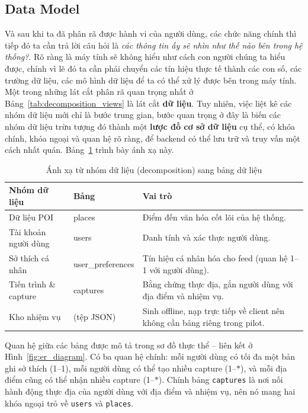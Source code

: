 \subsection{Data Model}
\contrib
Và sau khi ta đã phân rã được hành vi của người dùng, các chức năng chính thì tiếp đó ta cần trả lời câu hỏi là \textit{các thông tin
ấy sẽ nhìn như thế nào bên trong hệ thống?}. Rõ ràng là máy tính sẽ không hiểu như cách con người chúng ta hiểu được, chính vì lẽ đó 
ta cần phải chuyển các tín hiệu thực tế thành các con số, các trường dữ liệu, các mô hình dữ liệu để ta có thể xử lý được bên trong máy tính.
Một trong những lát cắt phân rã quan trọng nhất ở Bảng~\ref{tab:decomposition_views}
là lát cắt \textbf{dữ liệu}. Tuy nhiên, việc liệt kê các nhóm dữ liệu mới
chỉ là bước trung gian, bước quan trọng ở đây là biến các
nhóm dữ liệu trừu tượng đó thành một \textbf{lược đồ cơ sở dữ liệu} cụ
thể, có khóa chính, khóa ngoại và quan hệ rõ ràng, để backend có thể lưu
trữ và truy vấn một cách nhất quán. Bảng~\ref{tab:decomp_to_db} trình bày
ánh xạ này.

\begin{table}[H]
\centering
\caption{Ánh xạ từ nhóm dữ liệu (decomposition) sang bảng dữ liệu}
\label{tab:decomp_to_db}
\begin{tabularx}{\textwidth}{>{\raggedright\arraybackslash}p{3.6cm} >{\ttfamily\raggedright\arraybackslash}p{3.0cm} X}
\toprule
\textbf{Nhóm dữ liệu} & \textbf{\normalfont Bảng} & \textbf{Vai trò} \\
\midrule
Dữ liệu POI & places & Điểm đến văn hóa cốt lõi của hệ thống. \\
Tài khoản người dùng & users & Danh tính và xác thực người dùng. \\
Sở thích cá nhân & user\_preferences & Tín hiệu cá nhân hóa cho feed (quan hệ 1--1 với người dùng). \\
Tiến trình \& capture & captures & Bằng chứng thực địa, gắn người dùng với địa điểm và nhiệm vụ. \\
Kho nhiệm vụ & \textnormal{(tệp JSON)} & Sinh offline, nạp trực tiếp về client nên không cần bảng riêng trong pilot. \\
\bottomrule
\end{tabularx}
\end{table}

Quan hệ giữa các bảng được mô tả trong sơ đồ thực thể -- liên kết ở
Hình~\ref{fig:er_diagram}. Có ba quan hệ chính: mỗi người dùng có tối đa
một bản ghi sở thích (1--1), mỗi người dùng có thể tạo nhiều capture
(1--$\ast$), và mỗi địa điểm cũng có thể nhận nhiều capture (1--$\ast$).
Chính bảng \texttt{captures} là nơi nối hành động thực địa của người dùng
với địa điểm và nhiệm vụ, nên nó mang hai khóa ngoại trỏ về
\texttt{users} và \texttt{places}.

